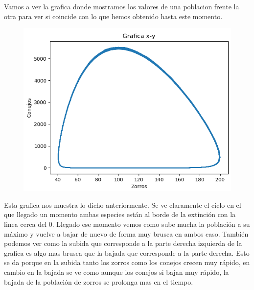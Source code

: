 \documentclass[]{article}
\begin{document}
Vamos a ver la grafica donde mostramos los valores de una poblacion frente la otra para ver si coincide con lo que hemos obtenido hasta este momento.
\begin{figure}[H]
	\centering
	\includegraphics[width=1\linewidth]{screenshot004}
\end{figure}


Esta grafica nos muestra lo dicho anteriormente. Se ve claramente el ciclo en el que llegado un momento ambas especies están al borde de la extinción con la linea cerca del 0.  Llegado ese momento vemos como sube mucha la población a su máximo y vuelve a bajar de nuevo de forma muy brusca en ambos caso. También podemos ver como la subida que corresponde a la parte derecha izquierda de la grafica es algo mas brusca que la bajada que corresponde a la parte derecha. Esto se da porque en la subida tanto los zorros como los conejos crecen muy rápido, en cambio en la bajada se ve como aunque los conejos si bajan muy rápido, la bajada de la población de zorros se prolonga mas en el tiempo.
\newpage
\end{document}
